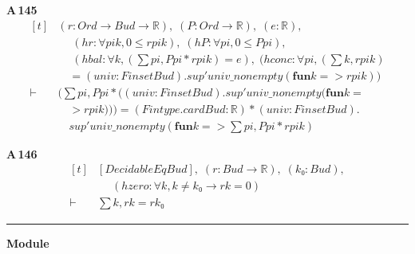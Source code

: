 \noindent\textbf{A\,145}\quad{}
{\footnotesize\[ \begin{aligned}[t]
&(\mathit{r} : \mathit{Ord} \to \mathit{Bud} \to \mathbb{R} ),\; (\mathit{P} : \mathit{Ord} \to \mathbb{R} ),\; (\mathit{e} : \mathbb{R} ),\\
&\quad \; (\mathit{hr} : \forall \mathit{pi} \mathit{k}, 0 \leq \mathit{r} \mathit{pi} \mathit{k}),\; (\mathit{hP} : \forall \mathit{pi}, 0 \leq \mathit{P} \mathit{pi}),\\
&\quad \; (\mathit{hbal} : \forall \mathit{k}, (\textstyle\sum \mathit{pi}, \mathit{P} \mathit{pi} * \mathit{r} \mathit{pi} \mathit{k}) = \mathit{e}),\; (\mathit{hconc} : \forall \mathit{pi}, (\textstyle\sum \mathit{k}, \mathit{r} \mathit{pi} \mathit{k})\\
&\quad = (\mathit{univ} : \mathit{Finset} \mathit{Bud}).\mathit{sup'} \mathit{univ\_nonempty} (\mathbf{fun} \mathit{k} => \mathit{r} \mathit{pi} \mathit{k}))\\
\vdash\;&(\textstyle\sum \mathit{pi}, \mathit{P} \mathit{pi} * ((\mathit{univ} : \mathit{Finset} \mathit{Bud}).\mathit{sup'} \mathit{univ\_nonempty} (\mathbf{fun} \mathit{k} =\\
&\quad > \mathit{r} \mathit{pi} \mathit{k}))) = (\mathit{Fintype}.\mathit{card} \mathit{Bud} : \mathbb{R} ) * (\mathit{univ} : \mathit{Finset} \mathit{Bud}).\\
&\quad \mathit{sup'} \mathit{univ\_nonempty} (\mathbf{fun} \mathit{k} => \textstyle\sum \mathit{pi}, \mathit{P} \mathit{pi} * \mathit{r} \mathit{pi} \mathit{k})
\end{aligned} \]}

\noindent\textbf{A\,146}\quad{}
{\footnotesize\[ \begin{aligned}[t]
&[\mathit{DecidableEq} \mathit{Bud}],\; (\mathit{r} : \mathit{Bud} \to \mathbb{R} ),\; (\mathit{k₀} : \mathit{Bud}),\\
&\quad \; (\mathit{hzero} : \forall \mathit{k}, \mathit{k} \neq \mathit{k₀} \to \mathit{r} \mathit{k} = 0)\\
\vdash\;&\textstyle\sum \mathit{k}, \mathit{r} \mathit{k} = \mathit{r} \mathit{k₀}
\end{aligned} \]}

\vspace{4pt}\noindent\rule{\columnwidth}{0.4pt}\par\vspace{2pt}
\noindent\textbf{Module }\par\vspace{3pt}

